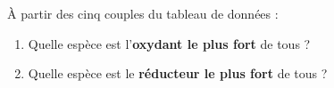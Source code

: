 \documentclass[11pt,a4paper]{article}
\newcounter{exo}
\begin{document}
\begin{exo}
À partir des cinq couples du tableau de données :
\begin{enumerate}[label=(\alph*),leftmargin=2em,topsep=1pt,itemsep=1pt]
  \item Quelle espèce est l'\textbf{oxydant le plus fort} de tous ?
  \item Quelle espèce est le \textbf{réducteur le plus fort} de tous ?
\end{enumerate}
\end{exo}
\end{document}
